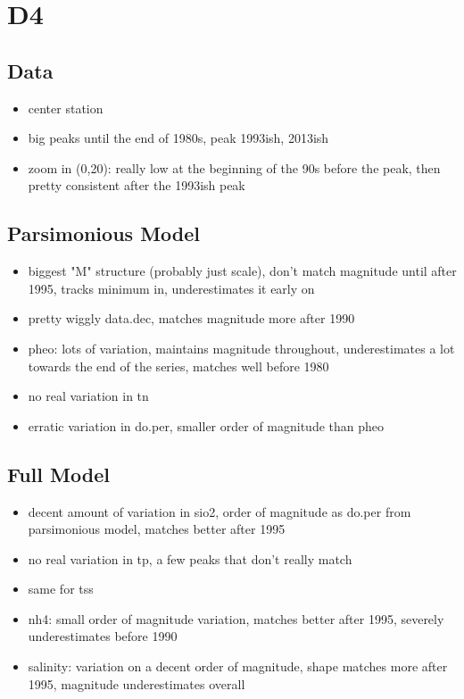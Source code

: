 \documentclass[12pt]{amsart}
\begin{document}
\section{D4}
\subsection{Data}
\begin{itemize}
\item center station
\item big peaks until the end of 1980s, peak 1993ish, 2013ish
\item zoom in (0,20): really low at the beginning of the 90s before the peak, then pretty consistent after the 1993ish peak
\end{itemize}
\subsection{Parsimonious Model}
\begin{itemize}
\item biggest "M" structure (probably just scale), don't match magnitude until after 1995, tracks minimum in, underestimates it early on
\item pretty wiggly data.dec, matches magnitude more after 1990
\item pheo: lots of variation, maintains magnitude throughout, underestimates a lot towards the end of the series, matches well before 1980
\item no real variation in tn
\item erratic variation in do.per, smaller order of magnitude than pheo
\end{itemize}

\subsection{Full Model}
\begin{itemize}
\item decent amount of variation in sio2, order of magnitude as do.per from parsimonious model, matches better after 1995
\item no real variation in tp, a few peaks that don't really match
\item same for tss
\item nh4: small order of magnitude variation, matches better after 1995, severely underestimates before 1990
\item salinity: variation on a decent order of magnitude, shape matches more after 1995, magnitude underestimates overall
\end{itemize}
\end{document}
